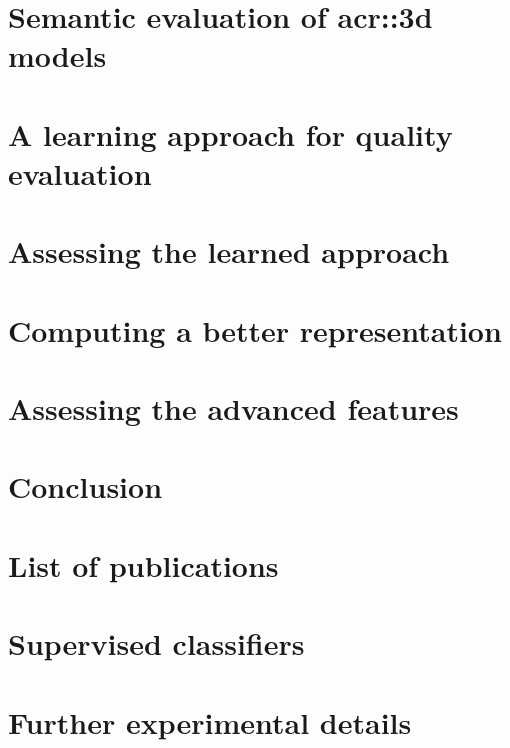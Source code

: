 \documentclass[12pt, twoside]{book}
\begin{document}
    \chapter{Semantic evaluation of \texorpdfstring{\gls*{acr::3d}}{3D} models}
        \label{chap::semantic_evaluation}
        

    \chapter{A learning approach for quality evaluation}
        \label{chap::learned_evaluation}
        

    \chapter{Assessing the learned approach}
        \label{chap::experiments}
        

    \chapter{Computing a better representation}
        \label{chap::better_representation}
        

    \chapter{Assessing the advanced features}
        \label{chap::advanced_experiments}
        

    \chapter{Conclusion}
        \label{chap::conclusion}
        

    \appendix
    \chapter{List of publications}
        \label{chap::publications}
        
    \chapter{Supervised classifiers}
        \label{chap::classifiers}
        
    \chapter{Further experimental details}
        \label{chap::details}
        

    \printglossary[type=\acronymtype]
    \printglossary
    
    \printbibliography[heading=bibintoc]

    
\end{document}

